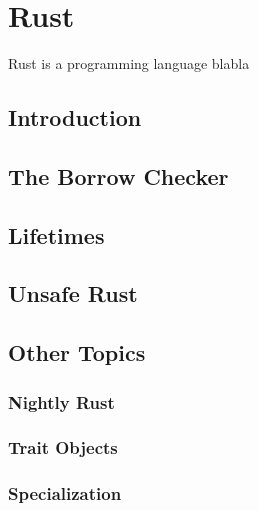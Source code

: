 \chapter{Rust}

Rust is a programming language blabla

\section{Introduction}

\section{The Borrow Checker}

\section{Lifetimes\label{sec:rust-lifetimes}}

\section{Unsafe Rust}

\section{Other Topics}

\subsection{Nightly Rust}

\subsection{Trait Objects\label{sec:trait-objects}}

\subsection{Specialization\label{sec:specialization}}
